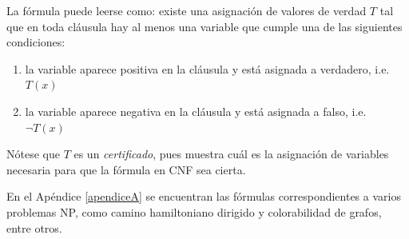 La fórmula puede leerse como: existe una asignación de valores de verdad $T$
tal que en toda cláusula hay al menos una variable que cumple una de las
siguientes condiciones:
\begin{enumerate}[--]
\item la variable aparece positiva en la cláusula y está asignada a verdadero,
i.e. $T(x)$
\item la variable aparece negativa en la cláusula y está asignada a falso, i.e.
$\neg T(x)$
\end{enumerate}

Nótese que $T$ es un \textit{certificado}, pues muestra cuál es la asignación 
de variables necesaria para que la fórmula en CNF sea cierta.

En el Apéndice \ref{apendiceA} se encuentran las fórmulas correspondientes a
varios problemas NP, como camino hamiltoniano dirigido y colorabilidad de
grafos, entre otros.
